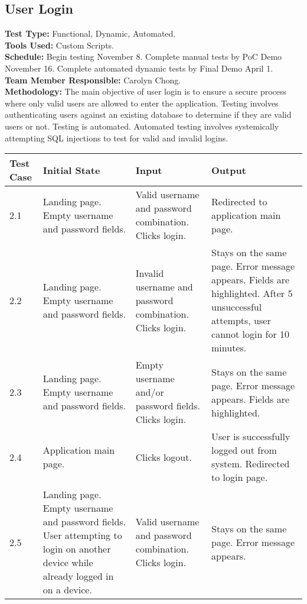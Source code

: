 \documentclass[12pt]{article}
\begin{document}
\subsection{User Login}
\textbf{Test Type:} Functional, Dynamic, Automated. \\
\textbf{Tools Used:} Custom Scripts. \\
\textbf{Schedule:} Begin testing November 8. Complete manual tests by PoC Demo November 16. Complete automated dynamic tests by Final Demo April 1. \\
\textbf{Team Member Responsible:} Carolyn Chong. \\
\textbf{Methodology:} The main objective of user login is to ensure a secure process where only valid users are allowed to enter the application. Testing involves authenticating users against an existing database to determine if they are valid users or not. Testing is automated. Automated testing involves systemically attempting SQL injections to test for valid and invalid logins.

\begin{longtable}{|p{2cm}|p{3cm}|p{5cm}|p{5cm}|}
\hline
\textbf{Test Case}  & \textbf{Initial State} & \textbf{Input} & \textbf{Output} \\ \hline
2.1 & Landing page. Empty username and password fields. & Valid username and password combination. Clicks login. & Redirected to application main page. \\ 
\hline
2.2 & Landing page. Empty username and password fields. & Invalid username and password combination. Clicks login. & Stays on the same page. Error message appears. Fields are highlighted. After 5 unsuccessful attempts, user cannot login for 10 minutes. \\
\hline
2.3 & Landing page. Empty username and password fields. & Empty username and/or password fields. Clicks login. & Stays on the same page. Error message appears. Fields are highlighted. \\
\hline
2.4 & Application main page. & Clicks logout. & User is successfully logged out from system. Redirected to login page. \\
\hline
2.5 & Landing page. Empty username and password fields. User attempting to login on another device while already logged in on a device. & Valid username and password combination. Clicks login. & Stays on the same page. Error message appears. \\ 
\hline
\end{longtable}

\end{document}
